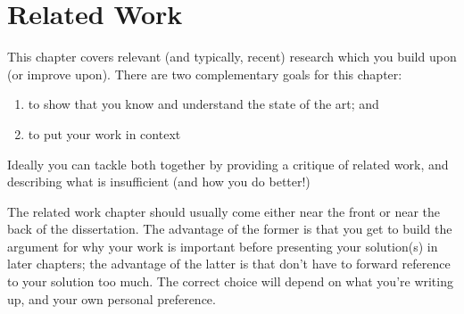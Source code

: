 \chapter{Related Work}

\begin{guidance}

    This chapter covers relevant (and typically, recent) research
    which you build upon (or improve upon). There are two complementary
    goals for this chapter:
    \begin{enumerate}
      \item to show that you know and understand the state of the art; and
      \item to put your work in context
    \end{enumerate}

    Ideally you can tackle both together by providing a critique of
    related work, and describing what is insufficient (and how you do
    better!)

    The related work chapter should usually come either near the front or
    near the back of the dissertation. The advantage of the former is that
    you get to build the argument for why your work is important before
    presenting your solution(s) in later chapters; the advantage of the
    latter is that don't have to forward reference to your solution too
    much. The correct choice will depend on what you're writing up, and
    your own personal preference.

\end{guidance}

